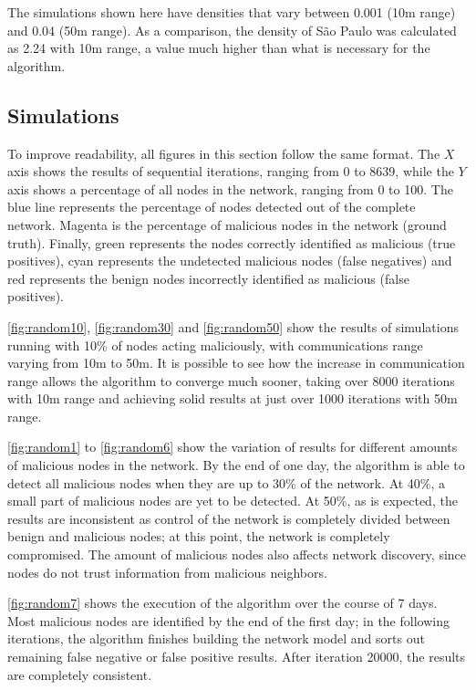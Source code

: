 \documentclass[conference]{IEEEtran}
\begin{document}
The simulations shown here have densities that vary between 0.001 (10m range) and 0.04 (50m range).
As a comparison, the density of São Paulo was calculated as 2.24 with 10m range, a value much higher than what is necessary for the algorithm.

\subsection{Simulations}
\label{subsection:simulations}
To improve readability, all figures in this section follow the same format.
The $X$ axis shows the results of sequential iterations, ranging from 0 to 8639, while the $Y$ axis shows a percentage of all nodes in the network, ranging from 0 to 100.
The blue line represents the percentage of nodes detected out of the complete network.
Magenta is the percentage of malicious nodes in the network (ground truth).
Finally, green represents the nodes correctly identified as malicious (true positives), cyan represents the undetected malicious nodes (false negatives) and red represents the benign nodes incorrectly identified as malicious (false positives).


\autoref{fig:random10}, \autoref{fig:random30} and \autoref{fig:random50} show the results of simulations running with 10\% of nodes acting maliciously, with communications range varying from 10m to 50m.
It is possible to see how the increase in communication range allows the algorithm to converge much sooner, taking over 8000 iterations with 10m range and achieving solid results at just over 1000 iterations with 50m range. 

\autoref{fig:random1} to \autoref{fig:random6} show the variation of results for different amounts of malicious nodes in the network.
By the end of one day, the algorithm is able to detect all malicious nodes when they are up to 30\% of the network.
At 40\%, a small part of malicious nodes are yet to be detected.
At 50\%, as is expected, the results are inconsistent as control of the network is completely divided between benign and malicious nodes; at this point, the network is completely compromised.
The amount of malicious nodes also affects network discovery, since nodes do not trust information from malicious neighbors.

\autoref{fig:random7} shows the execution of the algorithm over the course of 7 days.
Most malicious nodes are identified by the end of the first day; in the following iterations, the algorithm finishes building the network model and sorts out remaining false negative or false positive results.
After iteration 20000, the results are completely consistent.
\end{document}
